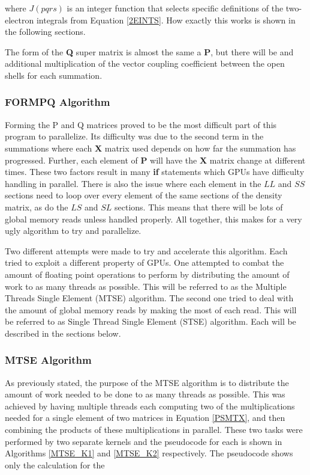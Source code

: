 \documentclass[12pt]{report}
\begin{document}
where $J(pqrs)$ is an integer function that selects specific definitions of the two-electron integrals from Equation \ref{2EINTS}. How exactly this works is shown in the following sections.

The form of the \textbf{Q} super matrix is almost the same a \textbf{P}, but there will be and additional multiplication of the vector coupling coefficient between the open shells for each summation.

\subsubsection{FORMPQ Algorithm}
Forming the P and Q matrices proved to be the most difficult part of this program to parallelize. Its difficulty was due to the second term in the summations where each \textbf{X} matrix used depends on how far the summation has progressed. Further, each element of \textbf{P} will have the \textbf{X} matrix change at different times. These two factors result in many \textbf{if} statements which GPUs have difficulty handling in parallel. There is also the issue where each element in the $LL$ and $SS$ sections need to loop over every element of the same sections of the density matrix, as do the $LS$ and $SL$ sections. This means that there will be lots of global memory reads unless handled properly. All together, this makes for a very ugly algorithm to try and parallelize.

Two different attempts were made to try and accelerate this algorithm. Each tried to exploit a different property of GPUs. One attempted to combat the amount of floating point operations to perform by distributing the amount of work to as many threads as possible. This will be referred to as the Multiple Threads Single Element (MTSE) algorithm. The second one tried to deal with the amount of global memory reads by making the most of each read. This will be referred to as Single Thread Single Element (STSE) algorithm. Each will be described in the sections below.

\subsubsection{MTSE Algorithm}
As previously stated, the purpose of the MTSE algorithm is to distribute the amount of work needed to be done to as many threads as possible. This was achieved by having multiple threads each computing two of the multiplications needed for a single element of two matrices in Equation \ref{PSMTX}, and then combining the products of these multiplications in parallel. These two tasks were performed by two separate kernels and the pseudocode for each is shown in Algorithms \ref{MTSE_K1} and \ref{MTSE_K2} respectively. The pseudocode shows only the calculation for the 
\end{document}
